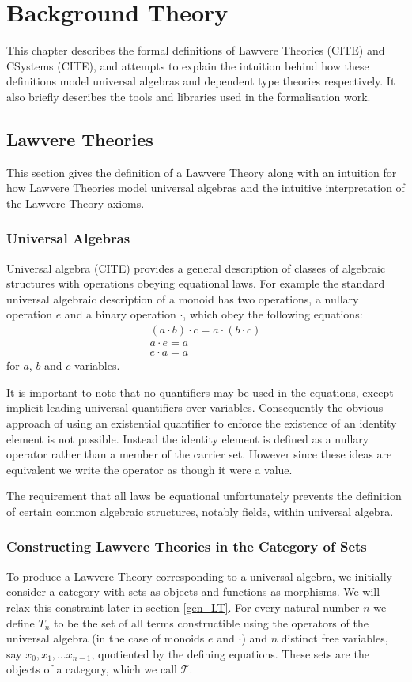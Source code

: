 \chapter{Background Theory}
This chapter describes the formal definitions of Lawvere Theories (CITE) and
CSystems (CITE), and attempts to explain the intuition behind how these
definitions model universal algebras and dependent type theories respectively.
It also briefly describes the tools and libraries used in the formalisation
work.

\section{Lawvere Theories}
This section gives the definition of a Lawvere Theory along with an intuition
for how Lawvere Theories model universal algebras and the intuitive
interpretation of the Lawvere Theory axioms. 

\subsection{Universal Algebras}
Universal algebra (CITE) provides a general description of classes of algebraic
structures with operations obeying equational laws. For example the standard
universal algebraic description of a monoid has two operations, a nullary
operation $e$ and a binary operation $\cdot$, which obey the following
equations:
\begin{gather*}
    (a\cdot b)\cdot c = a\cdot (b\cdot c) \\
    a \cdot e = a \\
    e \cdot a = a
\end{gather*}
for $a$, $b$ and $c$ variables.

It is important to note that no quantifiers may be used in the equations, except
implicit leading universal quantifiers over variables. Consequently the obvious
approach of using an existential quantifier to enforce the existence of an
identity element is not possible. Instead the identity element is defined as a
nullary operator rather than a member of the carrier set. However since these
ideas are equivalent we write the operator as though it were a value.

The requirement that all laws be equational unfortunately prevents the
definition of certain common algebraic structures, notably fields, within
universal algebra.

\subsection{Constructing Lawvere Theories in the Category of Sets}
To produce a Lawvere Theory corresponding to a universal algebra, we initially
consider a category with sets as objects and functions as morphisms. We will
relax this constraint later in section \ref{gen_LT}. For every natural number
$n$ we define $T_n$ to be the set of all terms constructible using the operators
of the universal algebra (in the case of monoids $e$ and $\cdot$) and $n$
distinct free variables, say $x_0, x_1,\ldots x_{n-1}$, quotiented by the
defining equations. These sets are the objects of a category, which we call
$\mathcal{T}$.

